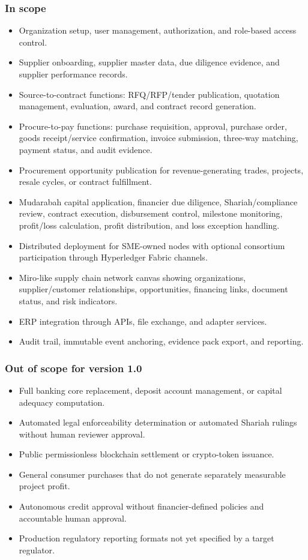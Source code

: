 \documentclass[11pt,a4paper]{article}
\begin{document}
\subsubsection{In scope}
\begin{itemize}
  \item Organization setup, user management, authorization, and role-based access control.
  \item Supplier onboarding, supplier master data, due diligence evidence, and supplier performance records.
  \item Source-to-contract functions: RFQ/RFP/tender publication, quotation management, evaluation, award, and contract record generation.
  \item Procure-to-pay functions: purchase requisition, approval, purchase order, goods receipt/service confirmation, invoice submission, three-way matching, payment status, and audit evidence.
  \item Procurement opportunity publication for revenue-generating trades, projects, resale cycles, or contract fulfillment.
  \item Mudarabah capital application, financier due diligence, Shariah/compliance review, contract execution, disbursement control, milestone monitoring, profit/loss calculation, profit distribution, and loss exception handling.
  \item Distributed deployment for SME-owned nodes with optional consortium participation through Hyperledger Fabric channels.
  \item Miro-like supply chain network canvas showing organizations, supplier/customer relationships, opportunities, financing links, document status, and risk indicators.
  \item ERP integration through APIs, file exchange, and adapter services.
  \item Audit trail, immutable event anchoring, evidence pack export, and reporting.
\end{itemize}

\subsubsection{Out of scope for version 1.0}
\begin{itemize}
  \item Full banking core replacement, deposit account management, or capital adequacy computation.
  \item Automated legal enforceability determination or automated Shariah rulings without human reviewer approval.
  \item Public permissionless blockchain settlement or crypto-token issuance.
  \item General consumer purchases that do not generate separately measurable project profit.
  \item Autonomous credit approval without financier-defined policies and accountable human approval.
  \item Production regulatory reporting formats not yet specified by a target regulator.
\end{itemize}
\end{document}
